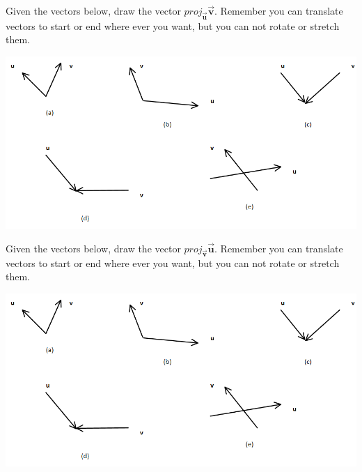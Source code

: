 \bq Given the vectors below, draw the vector $proj_{\vec{\textbf{u}}} \vec{\textbf{v}}$. Remember you can translate vectors to start or end where ever you want, but you can not rotate or stretch them.

\begin{center} \includegraphics[scale=.6]{vectorarray.png} \end{center}
\eq
\bq Given the vectors below, draw the vector $proj_{\vec{\textbf{v}}} \vec{\textbf{u}}$. Remember you can translate vectors to start or end where ever you want, but you can not rotate or stretch them.

\begin{center} \includegraphics[scale=.6]{vectorarray.png} \end{center}
\eq


